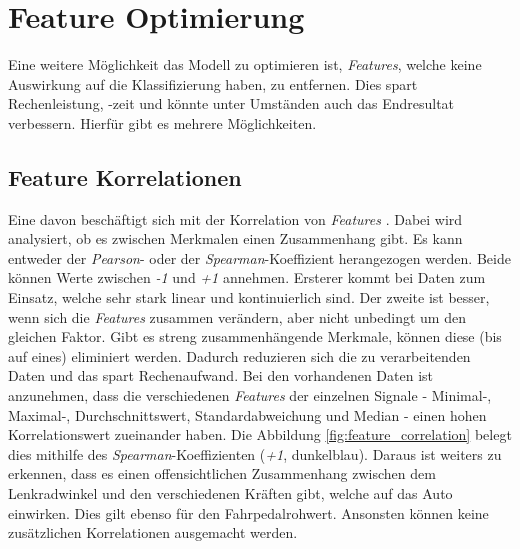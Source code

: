 \section{Feature Optimierung}
\label{sec:feature_optimization}

Eine weitere Möglichkeit das Modell zu optimieren ist, \textit{Features}, welche keine Auswirkung auf die Klassifizierung haben, zu entfernen. Dies spart Rechenleistung, -zeit und könnte unter Umständen auch das Endresultat verbessern. Hierfür gibt es mehrere Möglichkeiten.

\subsection{Feature Korrelationen}

Eine davon beschäftigt sich mit der Korrelation von \textit{Features} \cite{pittir8056}. Dabei wird analysiert, ob es zwischen Merkmalen einen Zusammenhang gibt. Es kann entweder der \textit{Pearson}- oder der \textit{Spearman}-Koeffizient herangezogen werden. Beide können Werte zwischen \textit{-1} und \textit{+1} annehmen. Ersterer kommt bei Daten zum Einsatz, welche sehr stark linear und kontinuierlich sind. Der zweite ist besser, wenn sich die \textit{Features} zusammen verändern, aber nicht unbedingt um den gleichen Faktor. Gibt es streng zusammenhängende Merkmale, können diese (bis auf eines) eliminiert werden. Dadurch reduzieren sich die zu verarbeitenden Daten und das spart Rechenaufwand. Bei den vorhandenen Daten ist anzunehmen, dass die verschiedenen \textit{Features} der einzelnen Signale - Minimal-, Maximal-, Durchschnittswert, Standardabweichung und Median - einen hohen Korrelationswert zueinander haben. Die Abbildung \ref{fig:feature_correlation} belegt dies mithilfe des \textit{Spearman}-Koeffizienten (\textit{+1}, dunkelblau). Daraus ist weiters zu erkennen, dass es einen offensichtlichen Zusammenhang zwischen dem Lenkradwinkel und den verschiedenen Kräften gibt, welche auf das Auto einwirken. Dies gilt ebenso für den Fahrpedalrohwert. Ansonsten können keine zusätzlichen Korrelationen ausgemacht werden.

